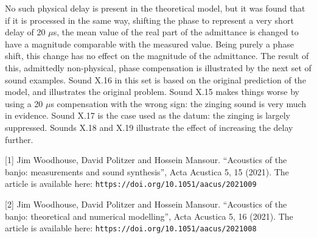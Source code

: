   No such physical delay is present in the theoretical model, but it was found 
  that if it is processed in the same way, shifting the phase to represent a 
  very short delay of 20 $\mu$s, the mean value of the real part of the 
  admittance is changed to have a magnitude comparable with the measured value. 
  Being purely a phase shift, this change has no effect on the magnitude of the 
  admittance. The result of this, admittedly non-physical, phase compensation 
  is illustrated by the next set of sound examples. Sound X.16 in this set is 
  based on the original prediction of the model, and illustrates the original 
  problem. Sound X.15 makes things worse by using a 20 $\mu$s compensation with 
  the wrong sign: the zinging sound is very much in evidence. Sound X.17 is the 
  case used as the datum: the zinging is largely suppressed. Sounds X.18 and 
  X.19 illustrate the effect of increasing the delay further. 






  \sectionreferences{}[1] Jim Woodhouse, David Politzer and Hossein Mansour. 
  “Acoustics of the banjo: measurements and sound synthesis”, Acta Acustica 5, 
  15 (2021). The article is available here: 
  \tt{}https://doi.org/10.1051/aacus/2021009\rm{} 

  [2] Jim Woodhouse, David Politzer and Hossein Mansour. “Acoustics of the 
  banjo: theoretical and numerical modelling”, Acta Acustica 5, 16 (2021). The 
  article is available here: \tt{}https://doi.org/10.1051/aacus/2021008\rm{} 